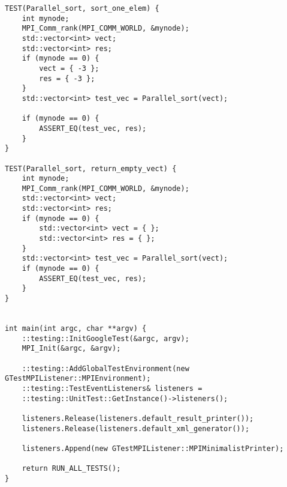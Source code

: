 \documentclass{report}
\begin{document}
\begin{verbatim}
TEST(Parallel_sort, sort_one_elem) {
    int mynode;
    MPI_Comm_rank(MPI_COMM_WORLD, &mynode);
    std::vector<int> vect;
    std::vector<int> res;
    if (mynode == 0) {
        vect = { -3 };
        res = { -3 };
    }
    std::vector<int> test_vec = Parallel_sort(vect);

    if (mynode == 0) {
        ASSERT_EQ(test_vec, res);
    }
}

TEST(Parallel_sort, return_empty_vect) {
    int mynode;
    MPI_Comm_rank(MPI_COMM_WORLD, &mynode);
    std::vector<int> vect;
    std::vector<int> res;
    if (mynode == 0) {
        std::vector<int> vect = { };
        std::vector<int> res = { };
    }
    std::vector<int> test_vec = Parallel_sort(vect);
    if (mynode == 0) {
        ASSERT_EQ(test_vec, res);
    }
}


int main(int argc, char **argv) {
    ::testing::InitGoogleTest(&argc, argv);
    MPI_Init(&argc, &argv);

    ::testing::AddGlobalTestEnvironment(new GTestMPIListener::MPIEnvironment);
    ::testing::TestEventListeners& listeners =
    ::testing::UnitTest::GetInstance()->listeners();

    listeners.Release(listeners.default_result_printer());
    listeners.Release(listeners.default_xml_generator());

    listeners.Append(new GTestMPIListener::MPIMinimalistPrinter);

    return RUN_ALL_TESTS();
}

 	\end{verbatim}
\end{document}
